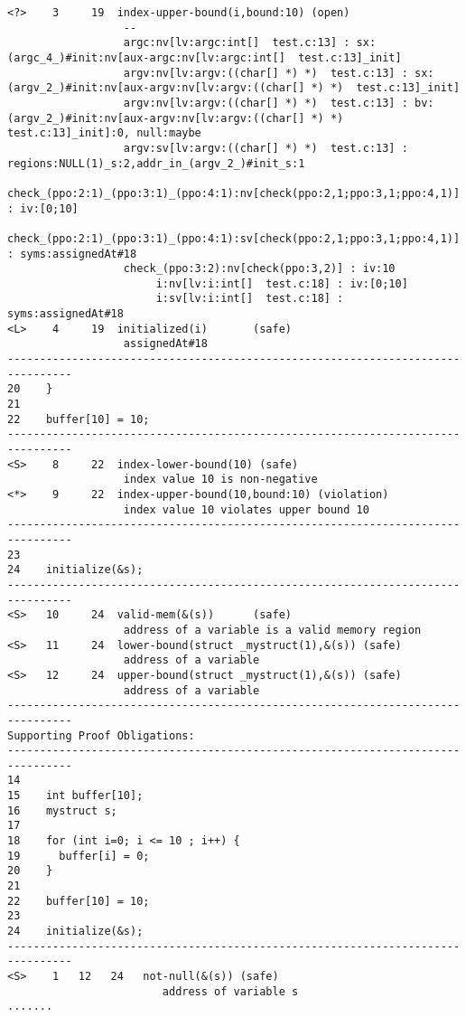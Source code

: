 \documentclass[11pt]{article}
\begin{document}
\begin{scriptsize}
\begin{verbatim}
<?>    3     19  index-upper-bound(i,bound:10) (open)
                  --
                  argc:nv[lv:argc:int[]  test.c:13] : sx:(argc_4_)#init:nv[aux-argc:nv[lv:argc:int[]  test.c:13]_init]
                  argv:nv[lv:argv:((char[] *) *)  test.c:13] : sx:(argv_2_)#init:nv[aux-argv:nv[lv:argv:((char[] *) *)  test.c:13]_init]
                  argv:nv[lv:argv:((char[] *) *)  test.c:13] : bv:(argv_2_)#init:nv[aux-argv:nv[lv:argv:((char[] *) *)  test.c:13]_init]:0, null:maybe
                  argv:sv[lv:argv:((char[] *) *)  test.c:13] : regions:NULL(1)_s:2,addr_in_(argv_2_)#init_s:1
                  check_(ppo:2:1)_(ppo:3:1)_(ppo:4:1):nv[check(ppo:2,1;ppo:3,1;ppo:4,1)] : iv:[0;10]
                  check_(ppo:2:1)_(ppo:3:1)_(ppo:4:1):sv[check(ppo:2,1;ppo:3,1;ppo:4,1)] : syms:assignedAt#18
                  check_(ppo:3:2):nv[check(ppo:3,2)] : iv:10
                       i:nv[lv:i:int[]  test.c:18] : iv:[0;10]
                       i:sv[lv:i:int[]  test.c:18] : syms:assignedAt#18
<L>    4     19  initialized(i)       (safe)
                  assignedAt#18
--------------------------------------------------------------------------------
20    }
21
22    buffer[10] = 10;
--------------------------------------------------------------------------------
<S>    8     22  index-lower-bound(10) (safe)
                  index value 10 is non-negative
<*>    9     22  index-upper-bound(10,bound:10) (violation)
                  index value 10 violates upper bound 10
--------------------------------------------------------------------------------
23
24    initialize(&s);
--------------------------------------------------------------------------------
<S>   10     24  valid-mem(&(s))      (safe)
                  address of a variable is a valid memory region
<S>   11     24  lower-bound(struct _mystruct(1),&(s)) (safe)
                  address of a variable
<S>   12     24  upper-bound(struct _mystruct(1),&(s)) (safe)
                  address of a variable
--------------------------------------------------------------------------------
Supporting Proof Obligations:
--------------------------------------------------------------------------------
14
15    int buffer[10];
16    mystruct s;
17
18    for (int i=0; i <= 10 ; i++) {
19      buffer[i] = 0;
20    }
21
22    buffer[10] = 10;
23
24    initialize(&s);
--------------------------------------------------------------------------------
<S>    1   12   24   not-null(&(s)) (safe)
                        address of variable s
.......
\end{verbatim}
\end{scriptsize}
\end{document}
